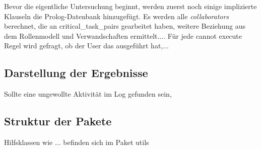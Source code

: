 Bevor die eigentliche Untersuchung beginnt, werden zuerst noch einige implizierte Klauseln die Prolog-Datenbank hinzugefügt. Es werden alle \textit{collaborators} berechnet, die an {critical\_task\_pairs} gearbeitet haben, weitere Beziehung aus dem Rollenmodell und Verwandschaften ermittelt....
Für jede cannot execute Regel wird gefragt, ob der User das ausgeführt hat,...

%
%
\subsection{Darstellung der Ergebnisse}
\label{sec:results}
Sollte eine ungewollte Aktivität im Log gefunden sein, 

%
%
\subsection{Struktur der Pakete}
Hilfsklassen wie ... befinden sich im Paket utils
